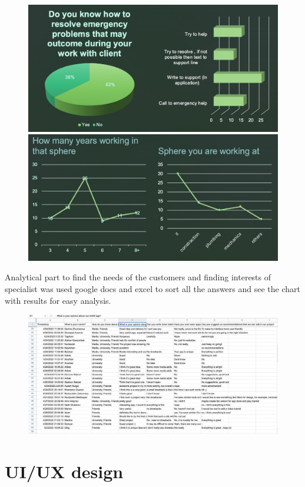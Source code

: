 \begin{figure}[H]
    \centering
    \includegraphics[scale=0.45]{images/analysis.png}
    \includegraphics[scale=0.45]{images/analysis1.png}
\end{figure}
Analytical part to find the needs of the customers and finding interests of specialist was used google docs and excel to sort all the answers and see the chart with results for easy analysis.
\begin{figure}[H]
    \centering
    \includegraphics[scale=0.45]{images/excelform.png}
\end{figure}
\section{UI/UX design}


